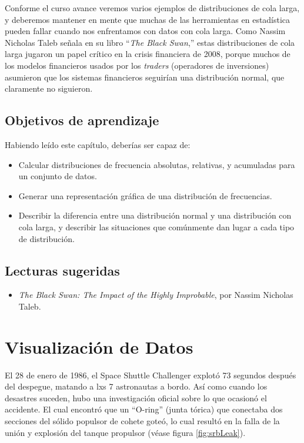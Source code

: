 \documentclass[
  12pt,
]{book}
\providecommand{\tightlist}{%
  \setlength{\itemsep}{0pt}\setlength{\parskip}{0pt}}
\begin{document}
Conforme el curso avance veremos varios ejemplos de distribuciones de cola larga, y deberemos mantener en mente que muchas de las herramientas en estadística pueden fallar cuando nos enfrentamos con datos con cola larga. Como Nassim Nicholas Taleb señala en su libro ``\emph{The Black Swan},'' estas distribuciones de cola larga jugaron un papel crítico en la crisis financiera de 2008, porque muchos de los modelos financieros usados por los \emph{traders} (operadores de inversiones) asumieron que los sistemas financieros seguirían una distribución normal, que claramente no siguieron.

\hypertarget{objetivos-de-aprendizaje-2}{%
\section{Objetivos de aprendizaje}\label{objetivos-de-aprendizaje-2}}

Habiendo leído este capítulo, deberías ser capaz de:

\begin{itemize}
\tightlist
\item
  Calcular distribuciones de frecuencia absolutas, relativas, y acumuladas para un conjunto de datos.
\item
  Generar una representación gráfica de una distribución de frecuencias.
\item
  Describir la diferencia entre una distribución normal y una distribución con cola larga, y describir las situaciones que comúnmente dan lugar a cada tipo de distribución.
\end{itemize}

\hypertarget{lecturas-sugeridas-2}{%
\section{Lecturas sugeridas}\label{lecturas-sugeridas-2}}

\begin{itemize}
\tightlist
\item
  \emph{The Black Swan: The Impact of the Highly Improbable}, por Nassim Nicholas Taleb.
\end{itemize}

\hypertarget{data-visualization}{%
\chapter{Visualización de Datos}\label{data-visualization}}

El 28 de enero de 1986, el Space Shuttle Challenger explotó 73 segundos después del despegue, matando a lxs 7 astronautas a bordo. Así como cuando los desastres suceden, hubo una investigación oficial sobre lo que ocasionó el accidente. El cual encontró que un ``O-ring'' (junta tórica) que conectaba dos secciones del sólido populsor de cohete goteó, lo cual resultó en la falla de la unión y explosión del tanque propulsor (véase figura \ref{fig:srbLeak}).
\end{document}
